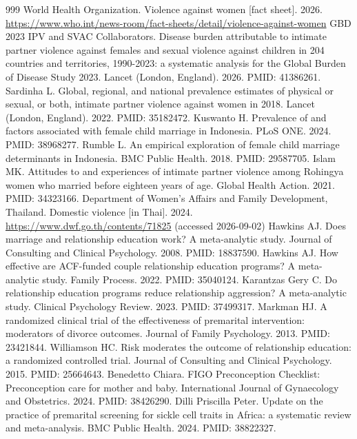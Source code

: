 \documentclass[11pt]{article}
\begin{document}
\clearpage
\begin{thebibliography}{999}\footnotesize
{} World Health Organization. Violence against women [fact sheet]. 2026. \url{https://www.who.int/news-room/fact-sheets/detail/violence-against-women}
 GBD 2023 IPV and SVAC Collaborators. Disease burden attributable to intimate partner violence against females and sexual violence against children in 204 countries and territories, 1990-2023: a systematic analysis for the Global Burden of Disease Study 2023. Lancet (London, England). 2026. PMID: 41386261.
 Sardinha L. Global, regional, and national prevalence estimates of physical or sexual, or both, intimate partner violence against women in 2018. Lancet (London, England). 2022. PMID: 35182472.
 Kuswanto H. Prevalence of and factors associated with female child marriage in Indonesia. PLoS ONE. 2024. PMID: 38968277.
 Rumble L. An empirical exploration of female child marriage determinants in Indonesia. BMC Public Health. 2018. PMID: 29587705.
 Islam MK. Attitudes to and experiences of intimate partner violence among Rohingya women who married before eighteen years of age. Global Health Action. 2021. PMID: 34323166.
 Department of Women's Affairs and Family Development, Thailand. Domestic violence [in Thai]. 2024. \url{https://www.dwf.go.th/contents/71825} (accessed 2026-09-02)
 Hawkins AJ. Does marriage and relationship education work? A meta-analytic study. Journal of Consulting and Clinical Psychology. 2008. PMID: 18837590.
 Hawkins AJ. How effective are ACF-funded couple relationship education programs? A meta-analytic study. Family Process. 2022. PMID: 35040124.
 Karantzas Gery C. Do relationship education programs reduce relationship aggression? A meta-analytic study. Clinical Psychology Review. 2023. PMID: 37499317.
 Markman HJ. A randomized clinical trial of the effectiveness of premarital intervention: moderators of divorce outcomes. Journal of Family Psychology. 2013. PMID: 23421844.
 Williamson HC. Risk moderates the outcome of relationship education: a randomized controlled trial. Journal of Consulting and Clinical Psychology. 2015. PMID: 25664643.
 Benedetto Chiara. FIGO Preconception Checklist: Preconception care for mother and baby. International Journal of Gynaecology and Obstetrics. 2024. PMID: 38426290.
 Dilli Priscilla Peter. Update on the practice of premarital screening for sickle cell traits in Africa: a systematic review and meta-analysis. BMC Public Health. 2024. PMID: 38822327.

\end{thebibliography}
\end{document}
